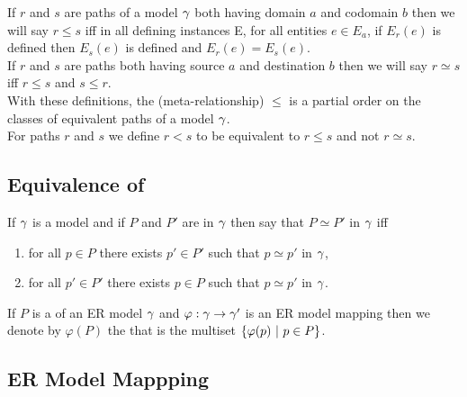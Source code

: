\noindent If $r$ and $s$ are paths of a model $\gamma$ both having domain $a$ and codomain $b$ then we will say $r \leq s$ iff in all defining instances E, for all entities $e \in E_a$, if $E_r(e)$ is defined then $E_s(e)$ is defined and $E_r(e)=E_s(e)$. \\

\noindent If $r$ and $s$ are paths both having source $a$ and destination $b$ then we will say $r \simeq s$ iff $r \leq s$ and $s \leq r$. \\

\noindent With these definitions,  the (meta-relationship) $\leq$ is a partial order on the classes of equivalent paths of a model $\gamma$. \\

\noindent For paths $r$ and $s$ we define $r < s$ to be equivalent to $r \leq s$ and not $r \simeq s$. \\

\subsection{Equivalence of  }
\begin{definition}
If $\gamma$ is a model and if $P$ and $P'$ are  in $\gamma$ then say that
$P \simeq P'$ in $\gamma$ iff
\begin{enumerate}
\item for all $p \in P$ there exists $p' \in P'$ such that $p \simeq p'$ in $\gamma$,
\item for all $p' \in P'$ there exists $p \in P$ such that $p \simeq p'$ in $\gamma$.
\end{enumerate} 
\end{definition}

If $P$ is a  of an ER model $\gamma$ and $\varphi : \gamma \rightarrow \gamma'$ is an ER model mapping then we denote by $\varphi(P)$ the  that is the multiset
$\left\{\varphi(p) \ \middle|\ p \in P\right\}$.

\subsection{ER Model Mappping}

